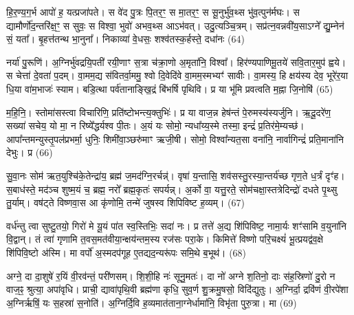 {\anuvakamend[{विश॑मे॒व ति॑ष्ठन्त्ये॒तामे॒वाथै॒न्द्रस्य॑ याज्यानुवा॒क्ये॑ तं वरु॑णाय॒ चतु॑र्दश च।11।}]}


हि॒र॒ण्य॒ग॒र्भ आपो॑ ह॒ यत्प्रजा॑पते। स वे॑द पु॒त्रः पि॒तर॒ꣳ॒ स मा॒तर॒ꣳ॒ स सू॒नुर्भु॑व॒थ्स भु॑व॒त्पुन॑र्मघः। स द्यामौर्णो॑द॒न्तरि॑क्ष॒ꣳ॒ स सुवः॒ स विश्वा॒ भुवो॑ अभव॒थ्स आ\-ऽभ॑वत्। उदु॒त्यञ्चि॒त्रम्। सप्र॑त्न॒वन्नवी॑य॒सा\-ऽग्ने᳚ द्यु॒म्नेन॑ सं॒ यता᳚। बृ॒हत्त॑तन्थ भा॒नुना᳚। निकाव्या॑ वे॒धसः॒ शश्व॑तस्क॒र्\mbox{}हस्ते॒ दधा॑नः (64)

नर्या॑ पु॒रूणि॑। अ॒ग्निर्भु॑वद्रयि॒पती॑ रयी॒णाꣳ स॒त्रा च॑क्रा॒णो अ॒मृता॑नि॒ विश्वा᳚। हिर॑ण्यपाणिमू॒तये॑ सवि॒तार॒मुप॑ ह्वये। स चेत्ता॑ दे॒वता॑ प॒दम्। वा॒मम॒द्य स॑वितर्वा॒ममु॒ श्वो दि॒वेदि॑वे वा॒मम॒स्मभ्यꣳ॑ सावीः। वा॒मस्य॒ हि क्षय॑स्य देव॒ भूरे॑र॒या धि॒या वा॑म॒भाजः॑ स्याम। बडि॒त्था पर्व॑तानाङ्खि॒द्रं बि॑भर्\mbox{}षि पृथिवि। प्र या भू॑मि प्रवत्वति म॒ह्ना जि॒नोषि॑ (65)

म॒हि॒नि॒। स्तोमा॑सस्त्वा विचारिणि॒ प्रति॑ष्टोभन्त्य॒क्तुभिः॑। प्र या वाज॒न्न हेष॑न्तं पे॒रुमस्य॑स्यर्जुनि। ऋ॒दू॒दरे॑ण॒ सख्या॑ सचेय॒ यो मा॒ न रिष्ये᳚द्धर्यश्व पी॒तः। अ॒यं यः सोमो॒ न्यधा᳚य्य॒स्मे तस्मा॒ इन्द्रं॑ प्र॒तिर॑मे॒म्यच्छ॑। आपा᳚न्तमन्युस्तृ॒पल॑प्रभर्मा॒ धुनिः॒ शिमी॑वा॒ञ्छरु॑माꣳ ऋजी॒षी। सोमो॒ विश्वा᳚न्यत॒सा वना॑नि॒ नार्वागिन्द्रं॑ प्रति॒माना॑नि देभुः। प्र (66)

सु॒वा॒नः सोम॑ ऋत॒युश्चि॑के॒तेन्द्रा॑य॒ ब्रह्म॑ ज॒मद॑ग्नि॒रर्चन्न्॑। वृषा॑ य॒न्तासि॒ शव॑सस्तु॒रस्या॒न्तर्य॑च्छ गृण॒ते ध॒र्त्रं दृꣳ॑ह। स॒बाध॑स्ते॒ मद॑ञ्च शुष्म॒यं च॒ ब्रह्म॒ नरो᳚ ब्रह्म॒कृतः॑ सपर्यन्न्। अ॒र्को वा॒ यत्तु॒रते॒ सोम॑चक्षा॒स्तत्रेदिन्द्रो॑ दधते पृ॒थ्सु तु॒र्याम्। वष॑ट्ते विष्णवा॒स आ कृ॑णोमि॒ तन्मे॑ जुषस्व शिपिविष्ट ह॒व्यम्। (67)

वर्ध॑न्तु त्वा सुष्टु॒तयो॒ गिरो॑ मे यू॒यं पा॑त स्व॒स्तिभिः॒ सदा॑ नः। प्र तत्ते॑ अ॒द्य शि॑पिविष्ट॒ नामा॒र्यः शꣳ॑सामि व॒युना॑नि वि॒द्वान्। तं त्वा॑ गृणामि त॒वस॒मत॑वीया॒न्क्षय॑न्तम॒स्य रज॑सः परा॒के। किमित्ते॑ विष्णो परि॒चक्ष्यं॑ भू॒त्प्रयद्व॑व॒क्षे शि॑पिवि॒ष्टो अ॑स्मि। मा वर्पो॑ अ॒स्मदप॑गूह ए॒तद्यद॒न्यरू॑पः समि॒थे ब॒भूथ॑। (68)

अग्ने॒ दा दा॒शुषे॑ र॒यिं वी॒रव॑न्तं॒ परी॑णसम्। शि॒शी॒हि नः॑ सूनु॒मतः॑। दा नो॑ अग्ने श॒तिनो॒ दाः स॑ह॒स्रिणो॑ दु॒रो न वाज॒ꣴ॒ श्रुत्या॒ अपा॑वृधि। प्राची॒ द्यावा॑पृथि॒वी ब्रह्म॑णा कृधि॒ सुव॒र्ण शु॒क्रमु॒षसो॒ विदि॑द्युतुः। अ॒ग्निर्दा॒ द्रवि॑णं वी॒रपे॑शा अ॒ग्निर्\mbox{}ऋषिं॒ यः स॒हस्रा॑ स॒नोति॑। अ॒ग्निर्दि॒वि ह॒व्यमात॑ताना॒ग्नेर्धामा॑नि॒ विभृ॑ता पुरु॒त्रा। मा (69)

